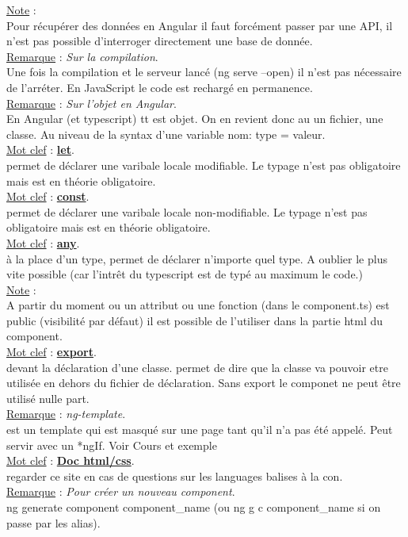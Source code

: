 \documentclass[a4paper,12pt,twoside]{article}
\newcommand{\urlcolor}{magenta}  %
\newcommand{\keycolor}{purple} %
\newcommand{\incode}[1]{{\footnotesize\ttfamily #1}} %
\newcommand{\rem}[2]{\noindent\underline{Remarque} : \textit{#1}.\\ \indent #2}
\newcommand{\note}[1]{\noindent\underline{Note} : \\ \indent #1}
\newcommand{\keyref}[2]{\hypersetup{urlcolor=\keycolor} \href{#1}{\textbf{#2}}\hypersetup{urlcolor=\urlcolor}}
\newcommand{\keyword}[3]{\noindent\underline{Mot clef} : \keyref{#1}{#2}. \\ \indent #3}
\begin{document}
\note{Pour récupérer des données en Angular il faut forcément passer par une API, il n'est pas possible d'interroger directement une base de donnée.}\\

\rem{Sur la compilation}{Une fois la compilation et le serveur lancé (\incode{ng serve --open}) il n'est pas nécessaire de l'arréter. En JavaScript le code est rechargé en permanence.}\\

\rem{Sur l'objet en Angular}{En Angular (et typescript) tt est objet. On en revient donc au un fichier, une classe. Au niveau de la syntax d'une variable nom: type = valeur.}\\

\keyword{}{let}{permet de déclarer une varibale locale modifiable. Le typage n'est pas obligatoire mais est en théorie obligatoire.}\\

\keyword{}{const}{permet de déclarer une varibale locale non-modifiable. Le typage n'est pas obligatoire mais est en théorie obligatoire.}\\

\keyword{}{any}{à la place d'un type, permet de déclarer n'importe quel type. A oublier le plus vite possible (car l'intrêt du typescript est de typé au maximum le code.)}\\

\note{A partir du moment ou un attribut ou une fonction (dans le component.ts) est public (visibilité par défaut) il est possible de l'utiliser dans la partie html du component.}\\

\keyword{}{export}{devant la déclaration d'une classe. permet de dire que la classe va pouvoir etre utilisée en dehors du fichier de déclaration. Sans \incode{export} le componet ne peut être utilisé nulle part.}\\

\rem{ng-template}{est un template qui est masqué sur une page tant qu'il n'a pas été appelé. Peut servir avec un *ngIf. Voir Cours et exemple}\\

\keyword{https://developer.mozilla.org/fr/}{Doc html/css}{regarder ce site en cas de questions sur les languages balises à la con.}\\

\rem{Pour créer un nouveau component}{ng generate component component\_name (ou ng g c component\_name si on passe par les alias).}\\
\end{document}

